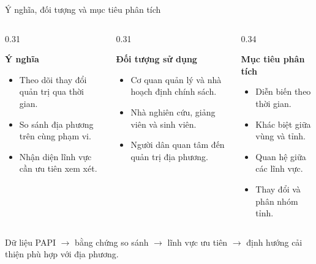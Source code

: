\begin{frame}[t]{Ý nghĩa, đối tượng và mục tiêu phân tích}
  \small
  \begin{columns}[T,onlytextwidth]
    \begin{column}{0.31\textwidth}
      \centerline{\textbf{Ý nghĩa}}
      \begin{itemize}
        \setlength{\itemsep}{7pt}
        \item[-] Theo dõi thay đổi quản trị qua thời gian.
        \item[-] So sánh địa phương trên cùng phạm vi.
        \item[-] Nhận diện lĩnh vực cần ưu tiên xem xét.
      \end{itemize}
    \end{column}
    \begin{column}{0.31\textwidth}
      \centerline{\textbf{Đối tượng sử dụng}}
      \begin{itemize}
        \setlength{\itemsep}{7pt}
        \item[-] Cơ quan quản lý và nhà hoạch định chính sách.
        \item[-] Nhà nghiên cứu, giảng viên và sinh viên.
        \item[-] Người dân quan tâm đến quản trị địa phương.
      \end{itemize}
    \end{column}
    \begin{column}{0.34\textwidth}
      \centerline{\textbf{Mục tiêu phân tích}}
      \begin{itemize}
        \setlength{\itemsep}{7pt}
        \item[-] Diễn biến theo thời gian.
        \item[-] Khác biệt giữa vùng và tỉnh.
        \item[-] Quan hệ giữa các lĩnh vực.
        \item[-] Thay đổi và phân nhóm tỉnh.
      \end{itemize}
    \end{column}
  \end{columns}

  \vspace{0.28cm}
  \centering
  {\footnotesize Dữ liệu PAPI $\rightarrow$ bằng chứng so sánh $\rightarrow$ lĩnh vực ưu tiên $\rightarrow$ định hướng cải thiện phù hợp với địa phương.}
\end{frame}
